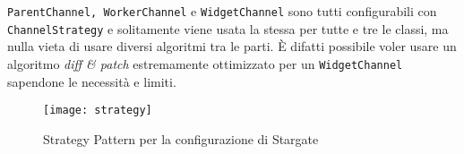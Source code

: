\texttt{ParentChannel, WorkerChannel} e \texttt{WidgetChannel} sono tutti configurabili con \texttt{ChannelStrategy} e solitamente viene usata la stessa per tutte e tre le classi, ma nulla vieta di usare diversi algoritmi tra le parti. È difatti possibile voler usare un algoritmo \textit{diff \& patch} estremamente ottimizzato per un \texttt{WidgetChannel} sapendone le necessità e limiti.

\begin{figure}[H] 
  \centering 
  \texttt{[image: strategy]} 
  \caption{Strategy Pattern per la configurazione di Stargate}
\end{figure}
